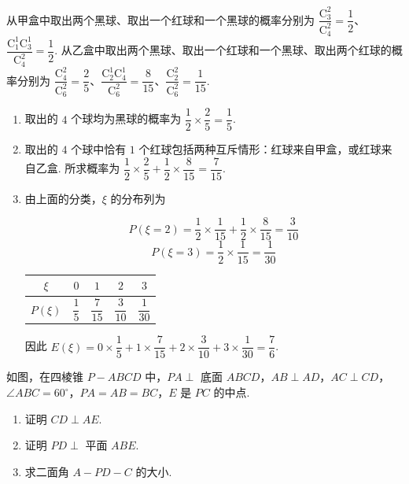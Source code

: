 \begin{solution}
从甲盒中取出两个黑球、取出一个红球和一个黑球的概率分别为
\(\dfrac{\mathrm C_3^2}{\mathrm C_4^2}=\dfrac{1}{2}\)、\(\dfrac{\mathrm C_1^1\mathrm C_3^1}{\mathrm C_4^2}=\dfrac{1}{2}\). 从乙盒中取出两个黑球、取出一个红球和一个黑球、取出两个红球的概率分别为 \(\dfrac{\mathrm C_4^2}{\mathrm C_6^2}=\dfrac{2}{5}\)、\(\dfrac{\mathrm C_2^1\mathrm C_4^1}{\mathrm C_6^2}=\dfrac{8}{15}\)、\(\dfrac{\mathrm C_2^2}{\mathrm C_6^2}=\dfrac{1}{15}\).

\begin{enumerate}
\item 取出的 \(4\) 个球均为黑球的概率为 \(\dfrac{1}{2}\times\dfrac{2}{5}=\dfrac{1}{5}\).
\item 取出的 \(4\) 个球中恰有 \(1\) 个红球包括两种互斥情形：红球来自甲盒，或红球来自乙盒. 所求概率为 \(\dfrac{1}{2}\times\dfrac{2}{5}+\dfrac{1}{2}\times\dfrac{8}{15}=\dfrac{7}{15}\).
\item 由上面的分类，\(\xi\) 的分布列为

\[
P(\xi=2)=\frac{1}{2}\times\frac{1}{15}+\frac{1}{2}\times\frac{8}{15}
=\frac{3}{10}
\]
\[
P(\xi=3)=\frac{1}{2}\times\frac{1}{15}
=\frac{1}{30}
\]

\begin{center}
\begin{tabular}{c|cccc}
\(\xi\) & \(0\) & \(1\) & \(2\) & \(3\) \\
\hline
\(P(\xi)\) & \(\dfrac{1}{5}\) & \(\dfrac{7}{15}\) & \(\dfrac{3}{10}\) & \(\dfrac{1}{30}\)
\end{tabular}
\end{center}

因此 \(E(\xi)=0\times\dfrac{1}{5}+1\times\dfrac{7}{15}+2\times\dfrac{3}{10}+3\times\dfrac{1}{30}=\dfrac{7}{6}\).
\end{enumerate}
\end{solution}

\begin{problem}
如图，在四棱锥 \(P - ABCD\) 中，\(PA \perp\) 底面 \(ABCD\)，\(AB \perp AD\)，\(AC \perp CD\)，\(\angle ABC = 60^{\circ}\)，\(PA = AB = BC\)，\(E\) 是 \(PC\) 的中点.

\begin{enumerate}
\item 证明 \(CD \perp AE\).
\item 证明 \(PD \perp\) 平面 \(ABE\).
\item 求二面角 \(A - PD - C\) 的大小.
\end{enumerate}

\end{problem}


